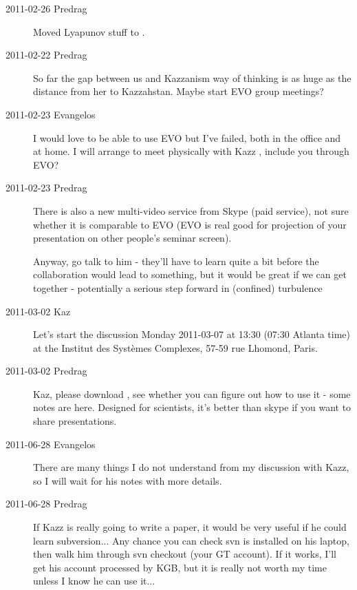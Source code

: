 \begin{description}

\item[2011-02-26 Predrag] Moved Lyapunov stuff to
    .


\item[2011-02-22 Predrag]
So far the gap between us and Kazzanism way of thinking is as huge
as the distance from her to Kazzahstan.
Maybe start EVO group meetings?

\item[2011-02-23 Evangelos]
I would love to be able to use EVO but I've
    failed, both in the office and at home. I will arrange to meet
    physically with Kazz \etal, include you
    through EVO?

\item[2011-02-23 Predrag]
There is also a new multi-video service from Skype (paid service), not
sure whether it is comparable to EVO (EVO is real good for projection of
your presentation on other people's seminar screen).

Anyway, go talk to him - they'll have to learn quite a bit before the
collaboration would lead to something, but it would be great if we can
get together - potentially a serious step forward in (confined)
turbulence

\item[2011-03-02 Kaz] Let's start the discussion
 Monday 2011-03-07 at 13:30 (07:30 Atlanta time) at the Institut des Syst\`emes Complexes, 57-59 rue Lhomond, Paris.

\item[2011-03-02 Predrag] Kaz, please download
, see whether you can
figure out how to use it - some notes are
{here}. Designed for scientists, it's better than skype if you want to
share presentations.

\item[2011-06-28 Evangelos] There are many things I do not understand from my discussion
with Kazz, so I will wait for his notes with more details.

\item[2011-06-28 Predrag] If Kazz is really going to write a paper, it would be
very useful if he could learn subversion... Any chance you can check svn is installed on his laptop,
then walk him through svn checkout (your GT account). If it works, I'll get his account processed by
KGB, but it is really not worth my time unless I know he can use it...


\end{description}
